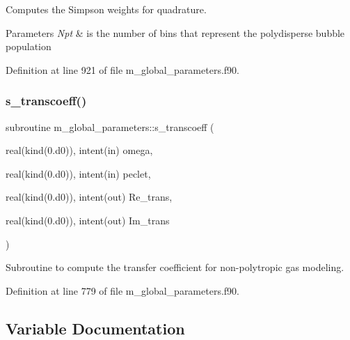 Computes the Simpson weights for quadrature. 


\begin{DoxyParams}{Parameters}
{\em Npt} & is the number of bins that represent the polydisperse bubble population \\
\hline
\end{DoxyParams}


Definition at line 921 of file m\+\_\+global\+\_\+parameters.\+f90.

\mbox{\label{namespacem__global__parameters_af52b102f1c17e28aa4ca3070f8806ca6}} 
\subsubsection{\texorpdfstring{s\+\_\+transcoeff()}{s\_transcoeff()}}
{\footnotesize\ttfamily subroutine m\+\_\+global\+\_\+parameters\+::s\+\_\+transcoeff (\begin{DoxyParamCaption}\item[{real(kind(0.d0)), intent(in)}]{omega,  }\item[{real(kind(0.d0)), intent(in)}]{peclet,  }\item[{real(kind(0.d0)), intent(out)}]{Re\+\_\+trans,  }\item[{real(kind(0.d0)), intent(out)}]{Im\+\_\+trans }\end{DoxyParamCaption})}



Subroutine to compute the transfer coefficient for non-\/polytropic gas modeling. 



Definition at line 779 of file m\+\_\+global\+\_\+parameters.\+f90.



\subsection{Variable Documentation}
\mbox{\label{namespacem__global__parameters_abebd95d9d0271fbda40f47f75a2d829b}} 
